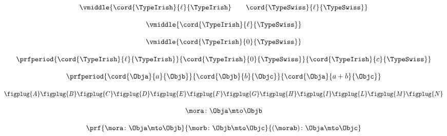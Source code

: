 \begin{forslides}
    \begin{equation}
        \label{eq:semicats-slides-55}
        \vmiddle{\cord{\TypeIrish}{\ell}{\TypeIrish} \qquad \cord{\TypeSwiss}{\ell}{\TypeSwiss}}
    \end{equation}

    \begin{equation}
        \label{eq:semicats-slides-56}
        \vmiddle{\cord{\TypeIrish}{\ell}{\TypeSwiss}}
    \end{equation}

    \begin{equation}
        \label{eq:semicats-slides-57}
        \vmiddle{\cord{\TypeIrish}{0}{\TypeSwiss}}
    \end{equation}

    \begin{equation}
        \label{eq:semicats-slides-58}
        \prfperiod{
            \cord{\TypeIrish}{\ell}{\TypeIrish}
        }{
            \cord{\TypeIrish}{0}{\TypeSwiss}
        }{
            \cord{\TypeIrish}{c}{\TypeSwiss}
        }
    \end{equation}

    \begin{equation}
        \label{eq:semicats-slides-59}
        \prfperiod{
            \cord{\Obja}{a}{\Objb}
        }{
            \cord{\Objb}{b}{\Objc}
        }{
            \cord{\Obja}{a+b}{\Objc}
        }
    \end{equation}

    \begin{equation}
        \label{eq:semicats-slides-60}
        \centering
        \figplug{A}
        \figplug{B}
        \figplug{C}
        \figplug{D}
        \figplug{E}
        \figplug{F}
        \figplug{G}
        \figplug{H}
        \figplug{I}
        \figplug{L}
        \figplug{M}
        \figplug{N}
    \end{equation}

    \begin{equation}
        \label{eq:semicats-slides-61}
        \mora\colon \Obja \mto \Objb
    \end{equation}

    \begin{equation}
        \label{eq:semicats-slides-62}
        \prf{
            \mora \colon \Obja \mto \Objb
        }{
            \morb\colon \Objb \mto \Objc
        }{
            (\morab )\colon \Obja \mto \Objc
        }
    \end{equation}


\end{forslides}
